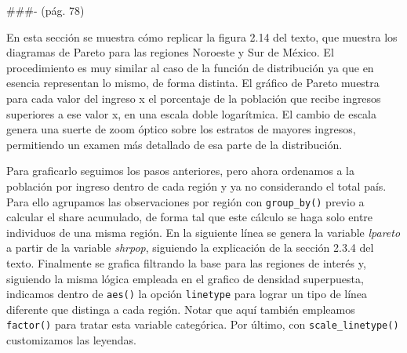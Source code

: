 \documentclass[
]{book}
\begin{document}
\#\#\#- (pág. 78)

En esta sección se muestra cómo replicar la figura 2.14 del texto, que muestra los diagramas de Pareto para las regiones Noroeste y Sur de México. El procedimiento es muy similar al caso de la función de distribución ya que en esencia representan lo mismo, de forma distinta. El gráfico de Pareto muestra para cada valor del ingreso x el porcentaje de la población que recibe ingresos superiores a ese valor x, en una escala doble logarítmica. El cambio de escala genera una suerte de zoom óptico sobre los estratos de mayores ingresos, permitiendo un examen más detallado de esa parte de la distribución.

Para graficarlo seguimos los pasos anteriores, pero ahora ordenamos a la población por ingreso dentro de cada región y ya no considerando el total país. Para ello agrupamos las observaciones por región con \texttt{group\_by()} previo a calcular el share acumulado, de forma tal que este cálculo se haga solo entre individuos de una misma región. En la siguiente línea se genera la variable \emph{lpareto} a partir de la variable \emph{shrpop}, siguiendo la explicación de la sección 2.3.4 del texto. Finalmente se grafica filtrando la base para las regiones de interés y, siguiendo la misma lógica empleada en el grafico de densidad superpuesta, indicamos dentro de \texttt{aes()} la opción \texttt{linetype} para lograr un tipo de línea diferente que distinga a cada región. Notar que aquí también empleamos \texttt{factor()} para tratar esta variable categórica. Por último, con \texttt{scale\_linetype()} customizamos las leyendas.
\end{document}
